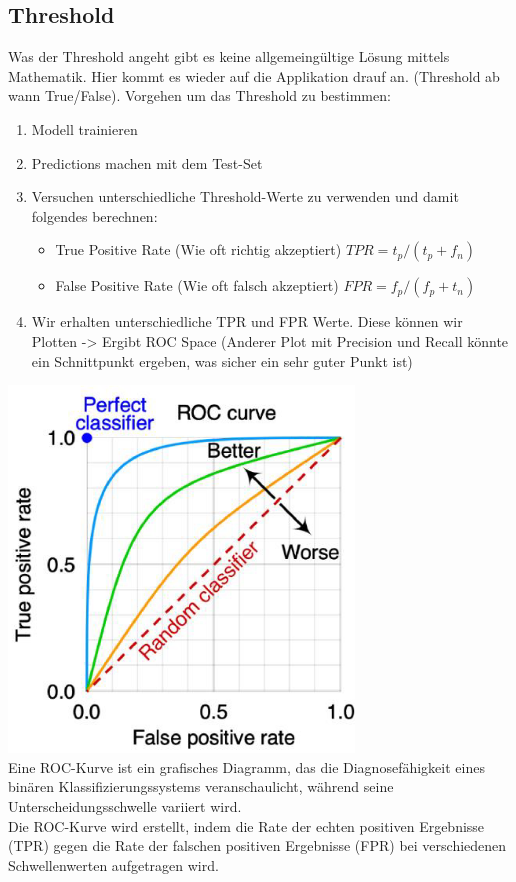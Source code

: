 \subsection{Threshold}
Was der Threshold angeht gibt es keine allgemeingültige Lösung mittels Mathematik. Hier kommt es wieder auf die Applikation drauf an. (Threshold ab wann True/False). Vorgehen um das Threshold zu bestimmen:
\begin{enumerate}
\item Modell trainieren
\item Predictions machen mit dem Test-Set
\item Versuchen unterschiedliche Threshold-Werte zu verwenden und damit folgendes berechnen:
\begin{itemize}
\item True Positive Rate (Wie oft richtig akzeptiert) $TPR = t_p/(t_p + f_n)$
\item False Positive Rate (Wie oft falsch akzeptiert) $FPR = f_p/(f_p + t_n)$
\end{itemize}
\item Wir erhalten unterschiedliche TPR und FPR Werte. Diese können wir Plotten -> Ergibt ROC Space (Anderer Plot mit Precision und Recall könnte ein Schnittpunkt ergeben, was sicher ein sehr guter Punkt ist)
\end{enumerate}
\includegraphics[width=0.6\linewidth]{img/treshold.png}\\
Eine ROC-Kurve ist ein grafisches Diagramm, das die Diagnosefähigkeit eines binären Klassifizierungssystems veranschaulicht, während seine Unterscheidungsschwelle variiert wird. \\
Die ROC-Kurve wird erstellt, indem die Rate der echten positiven Ergebnisse (TPR) gegen die Rate der falschen positiven Ergebnisse (FPR) bei verschiedenen Schwellenwerten aufgetragen wird.
